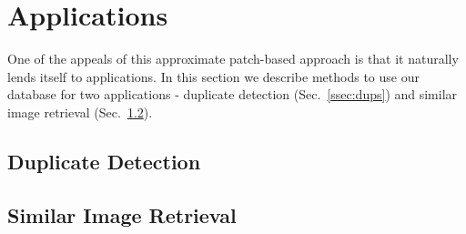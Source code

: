 \section{Applications}\label{sec:apps}

One of the appeals of this approximate patch-based approach
is that it naturally lends itself to applications. In this
section we describe methods to use our database for
two applications - duplicate detection (Sec.~\ref{ssec:dups})
and similar image retrieval (Sec.~\ref{ssec:retr}).

\subsection{Duplicate Detection}\label{ssec:dup}

\subsection{Similar Image Retrieval}\label{ssec:retr}

